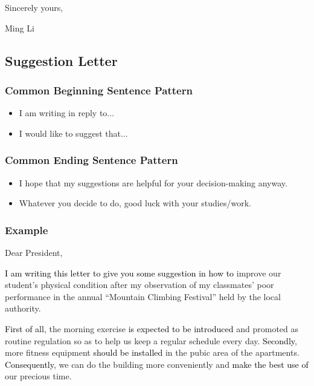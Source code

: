 \documentclass{article}
\begin{document}
\hfill Sincerely yours,

\hfill Ming Li

\subsection{Suggestion Letter}
\label{sec:suggestion-letter}

\subsubsection{Common Beginning Sentence Pattern}
\label{sec:comm-beginn-sent-1}

\begin{itemize}
\item I am writing in reply to...
\item I would like to suggest that...
\end{itemize}

\subsubsection{Common Ending Sentence Pattern}
\label{sec:comm-ending-sent-1}

\begin{itemize}
\item I hope that my suggestions are helpful for your decision-making anyway.
\item Whatever you decide to do, good luck with your studies/work.
\end{itemize}

\subsubsection{Example}
\label{sec:example-1}
Dear President,
\par \textcolor{black}{I am writing this letter to give you some suggestion in how to} improve our student's
physical condition after my observation of my classmates' poor performance in the annual
``Mountain Climbing Festival'' held by the local authority.
\par \textcolor{black}{First of all}, the morning exercise \textcolor{black}{is expected to be introduced} and promoted as
routine regulation so as to help us keep a regular schedule every day. \textcolor{black}{Secondly}, more
fitness equipment \textcolor{black}{should be installed} in the pubic area of the
apartments. \textcolor{black}{Consequently}, we can do the building more conveniently and
\textcolor{black}{make the best use of} our precious time.
\end{document}
